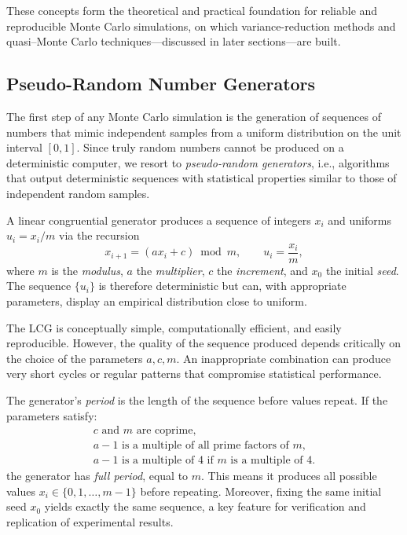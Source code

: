 These concepts form the theoretical and practical foundation for reliable and reproducible Monte Carlo simulations, on which variance-reduction methods and quasi--Monte Carlo techniques—discussed in later sections—are built.
\subsection{Pseudo-Random Number Generators} 

The first step of any Monte Carlo simulation is the generation of sequences of numbers that mimic independent samples from a uniform distribution on the unit interval \([0,1]\). 
Since truly random numbers cannot be produced on a deterministic computer, we resort to \emph{pseudo-random generators}, i.e., algorithms that output deterministic sequences with statistical properties similar to those of independent random samples.

\begin{definition}
A linear congruential generator produces a sequence of integers \( x_i \) and uniforms \( u_i = x_i / m \) via the recursion
\[
x_{i+1} = (a x_i + c) \bmod m, \qquad u_i = \frac{x_i}{m},
\]
where \( m \) is the \emph{modulus}, \( a \) the \emph{multiplier}, \( c \) the \emph{increment}, and \( x_0 \) the initial \emph{seed}. 
The sequence \(\{u_i\}\) is therefore deterministic but can, with appropriate parameters, display an empirical distribution close to uniform.
\end{definition}

The LCG is conceptually simple, computationally efficient, and easily reproducible. 
However, the quality of the sequence produced depends critically on the choice of the parameters \(a, c, m\). 
An inappropriate combination can produce very short cycles or regular patterns that compromise statistical performance.



\begin{remark}
The generator’s \emph{period} is the length of the sequence before values repeat. 
If the parameters satisfy:
\[
\begin{gathered}
c \text{ and } m \text{ are coprime},\\
a - 1 \text{ is a multiple of all prime factors of } m,\\
a - 1 \text{ is a multiple of } 4 \text{ if } m \text{ is a multiple of } 4.
\end{gathered}
\]
the generator has \emph{full period}, equal to \(m\). 
This means it produces all possible values \(x_i \in \{0, 1, \ldots, m-1\}\) before repeating.
Moreover, fixing the same initial seed \(x_0\) yields exactly the same sequence, a key feature for verification and replication of experimental results.
\end{remark}

